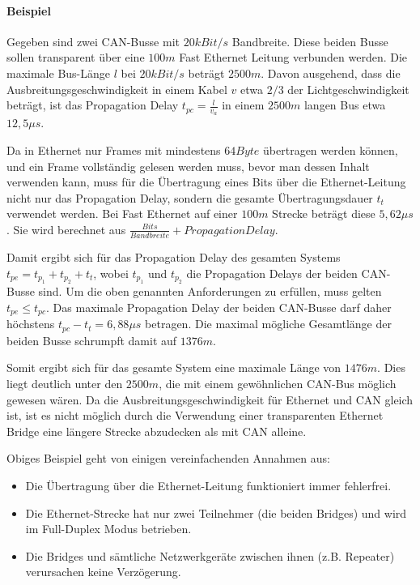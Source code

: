 \paragraph{Beispiel}
Gegeben sind zwei CAN-Busse mit $20 kBit/s$ Bandbreite. Diese beiden Busse sollen
transparent über eine $100 m$ Fast Ethernet Leitung verbunden werden. Die maximale
Bus-Länge $l$ bei $20 kBit/s$ beträgt $2500 m$. Davon ausgehend, dass die
Ausbreitungsgeschwindigkeit in einem Kabel $v$ etwa $2/3$ der Lichtgeschwindigkeit beträgt,
ist das Propagation Delay $t_{pc} = \frac{l}{v_a}$ in einem $2500 m$ langen Bus etwa
$12,5 \mu s$.

Da in Ethernet nur Frames mit mindestens $64 Byte$ übertragen werden können, und ein
Frame vollständig gelesen werden muss, bevor man dessen Inhalt verwenden kann, muss
für die Übertragung eines Bits über die Ethernet-Leitung nicht nur das Propagation
Delay, sondern die gesamte Übertragungsdauer $t_t$ verwendet werden. Bei Fast
Ethernet auf einer $100 m$ Strecke beträgt diese $5,62 \mu s$. Sie wird berechnet aus
$\frac{Bits}{Bandbreite} + Propagation Delay$.

Damit ergibt sich für das Propagation Delay des gesamten Systems $t_{pe} = t_{p_1} +
t_{p_2} + t_t$, wobei $t_{p_1}$ und $t_{p_2}$ die Propagation Delays der beiden
CAN-Busse sind. Um die oben genannten Anforderungen zu erfüllen, muss gelten $t_{pe}
\leq t_{pc}$. Das maximale Propagation Delay der beiden CAN-Busse darf daher
höchstens $t_{pc} - t_t = 6,88 \mu s$ betragen. Die maximal mögliche Gesamtlänge der
beiden Busse schrumpft damit auf $1376 m$.

Somit ergibt sich für das gesamte System eine maximale Länge von $1476 m$. Dies liegt
deutlich unter den $2500 m$, die mit einem gewöhnlichen CAN-Bus möglich gewesen
wären. Da die Ausbreitungsgeschwindigkeit für Ethernet und CAN gleich ist, ist es
nicht möglich durch die Verwendung einer transparenten Ethernet Bridge eine längere
Strecke abzudecken als mit CAN alleine.

Obiges Beispiel geht von einigen vereinfachenden Annahmen aus:
\begin{itemize}
        \item Die Übertragung über die Ethernet-Leitung funktioniert immer
                fehlerfrei.
        \item Die Ethernet-Strecke hat nur zwei Teilnehmer (die beiden Bridges) und
                wird im Full-Duplex Modus betrieben.
        \item Die Bridges und sämtliche Netzwerkgeräte zwischen ihnen (z.B. Repeater)
                verursachen keine Verzögerung.
\end{itemize}

